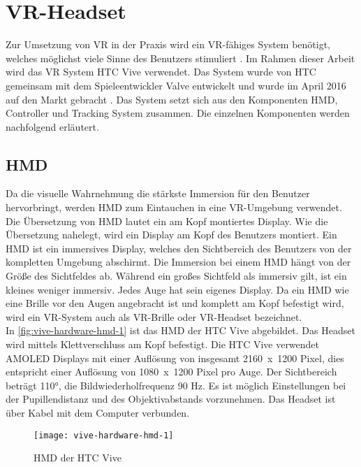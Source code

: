 \section{\acs{VR}-Headset}
Zur Umsetzung von \ac{VR} in der Praxis wird ein \ac{VR}-fähiges System benötigt, welches möglichst viele Sinne des Benutzers stimuliert \cite{Dorner.2019}. Im Rahmen dieser Arbeit wird das \acs{VR} System HTC Vive verwendet. Das System wurde von HTC gemeinsam mit dem Spieleentwickler Valve entwickelt und wurde im April 2016 auf den Markt gebracht \cite{Fehrenbach.14.4.2016}. Das System setzt sich aus den Komponenten \ac{HMD}, Controller und Tracking System zusammen. Die einzelnen Komponenten werden nachfolgend erläutert.

\subsection{\acl{HMD}}
Da die visuelle Wahrnehmung die stärkste Immersion für den Benutzer hervorbringt, werden \ac{HMD} zum Eintauchen in eine \ac{VR}-Umgebung verwendet. Die Übersetzung von \ac{HMD} lautet \glqq ein am Kopf montiertes Display\grqq. Wie die Übersetzung nahelegt, wird ein Display am Kopf des Benutzers montiert. Ein \ac{HMD} ist ein immersives Display, welches den Sichtbereich des Benutzers von der kompletten Umgebung abschirmt. Die Immersion bei einem \ac{HMD} hängt von der Größe des Sichtfeldes ab. Während ein großes Sichtfeld als immersiv gilt, ist ein kleines weniger immersiv. \cite{Dorner.2019} Jedes Auge hat sein eigenes Display. Da ein \ac{HMD} wie eine Brille vor den Augen angebracht ist und komplett am Kopf befestigt wird, wird ein \ac{VR}-System auch als \ac{VR}-Brille oder \ac{VR}-Headset bezeichnet. \\
In \autoref{fig:vive-hardware-hmd-1} ist das \ac{HMD} der HTC Vive abgebildet. Das Headset wird mittels Klettverschluss am Kopf befestigt. Die HTC Vive verwendet AMOLED Displays mit einer Auflösung von insgesamt \mbox{2160 x 1200} Pixel, dies entspricht einer Auflösung von \mbox{1080 x 1200} Pixel pro Auge. Der Sichtbereich beträgt 110°, die Bildwiederholfrequenz 90 Hz. Es ist möglich Einstellungen bei der Pupillendistanz und des Objektivabstands vorzunehmen. Das Headset ist über Kabel mit dem Computer verbunden. \cite{ViveProduct}

\begin{figure}[!htbp]
	\centering
	\texttt{[image: vive-hardware-hmd-1]}
	\caption[HMD der HTC Vive]{\acs{HMD} der HTC Vive \cite{ViveHMD}}
	\label{fig:vive-hardware-hmd-1}
\end{figure}

